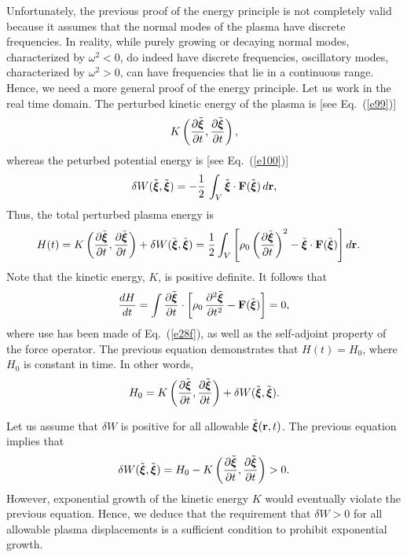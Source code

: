 \documentclass[12pt,prb,aps,notitlepage]{revtex4-1}
\newcommand{\bxi}{\mbox{\boldmath$\xi$}}
\begin{document}
Unfortunately, the previous proof of the energy principle is not completely valid because it assumes that  the normal modes of the plasma
have discrete frequencies. In reality, while purely growing or decaying normal modes, characterized by $\omega^2<0$, do indeed have discrete frequencies, oscillatory modes, characterized by 
$\omega^2>0$, can have frequencies that lie in a continuous range. Hence, we need a more general proof of the energy principle. Let
us work in the real time domain. The perturbed kinetic energy of the plasma is [see Eq.~(\ref{e99})] 
\begin{equation}
K\left(\frac{\partial\tilde{\bxi}}{\partial t},\frac{\partial\tilde{\bxi}}{\partial t}\right),
\end{equation}
whereas the peturbed potential energy is  [see Eq.~(\ref{e100})]
\begin{equation} \label{e131f}
\delta W(\tilde{\bxi},\tilde{\bxi}) = - \frac{1}{2}\,\int_V \tilde{\bxi}\cdot {\bf F}(\tilde{\bxi})\,d{\bf r},
\end{equation}
Thus, the total perturbed plasma energy
is 
\begin{align}
H(t)& = K\left(\frac{\partial\tilde{\bxi}}{\partial t},\frac{\partial\tilde{\bxi}}{\partial t}\right) + \delta W(\tilde{\bxi},\tilde{\bxi})= \frac{1}{2}\int_V\left[\rho_0\left(\frac{\partial\tilde{\bxi}}{\partial t}\right)^2 - \tilde{\bxi}\cdot{\bf F}(\tilde{\bxi})\right]d{\bf r}.
\end{align}
Note that the kinetic energy, $K$, is positive definite. 
It follows that 
\begin{equation}
\frac{dH}{dt} = \int \frac{\partial\tilde{\bxi}}{\partial t}\cdot\left[\rho_0\,\frac{\partial^2\tilde{\bxi}}{\partial t^2}-{\bf F}(\tilde{\bxi})\right]=0,
\end{equation}
where use has been made of Eq.~(\ref{e28f}), as well as the self-adjoint property of the force operator. The
previous equation demonstrates that $H(t)= H_0$, where $H_0$ is constant in time. In other words,
\begin{equation}\label{e125f}
H_0 = K\left(\frac{\partial\tilde{\bxi}}{\partial t},\frac{\partial\tilde{\bxi}}{\partial t}\right) + \delta W(\tilde{\bxi},\tilde{\bxi}).
\end{equation}

Let us assume that $\delta W$ is positive for all allowable $\tilde{\bxi}({\bf r},t)$. The previous equation implies that
\begin{equation}
\delta W(\tilde{\bxi},\tilde{\bxi}) = H_0 - K\left(\frac{\partial\tilde{\bxi}}{\partial t},\frac{\partial\tilde{\bxi}}{\partial t}\right) > 0.
\end{equation}
However, exponential growth of the kinetic energy $K$  would eventually violate the previous equation.
Hence, we deduce that the requirement that $\delta W>0$ for all allowable  plasma displacements is a sufficient condition to prohibit exponential growth. 
\end{document}
